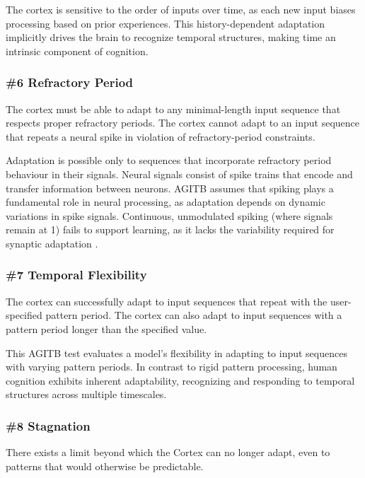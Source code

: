 \documentclass{article}
\newenvironment{one_assertion}[1]
{
	\begin{tabular}{p{1.5cm}p{8.2cm}}
		\textbf{Assertion:} & #1 \\
	}{
	\end{tabular}\\
}
\newenvironment{two_assertions}[2]
{
	\begin{tabular}{p{1.5cm}p{8.2cm}}
		\textbf{Assertion:} & #1 \\
		\textbf{Assertion:} & #2 \\
	}{
	\end{tabular}\\
}
\begin{document}
	The cortex is sensitive to the order of inputs over time, as each new input biases processing based on prior experiences. This history-dependent adaptation implicitly drives the brain to recognize temporal structures, making time an intrinsic component of cognition.
	
	
	\subsubsection*{\#6 Refractory Period}
	\begin{two_assertions}
		{The cortex must be able to adapt to any minimal-length input sequence that respects proper refractory periods.}
		{The cortex cannot adapt to an input sequence that repeats a neural spike in violation of refractory-period constraints.}
	\end{two_assertions}
	
	Adaptation is possible only to sequences that incorporate refractory period behaviour in their signals. Neural signals consist of spike trains that encode and transfer information between neurons. AGITB assumes that spiking plays a fundamental role in neural processing, as adaptation depends on dynamic variations in spike signals. Continuous, unmodulated spiking (where signals remain at 1) fails to support learning, as it lacks the variability required for synaptic adaptation \cite{Gerstner2002}. 
	
	\subsubsection*{\#7 Temporal Flexibility}
	\begin{two_assertions}
		{The cortex can successfully adapt to input sequences that repeat with the user-specified pattern period.}
		{The cortex can also adapt to input sequences with a pattern period longer than the specified value.}
	\end{two_assertions}
	
	This AGITB test evaluates a model’s flexibility in adapting to input sequences with varying pattern periods. In contrast to rigid pattern processing, human cognition exhibits inherent adaptability, recognizing and responding to temporal structures across multiple timescales.
	
	\subsubsection*{\#8 Stagnation}
	\begin{one_assertion}
		{There exists a limit beyond which the Cortex can no longer adapt, even to patterns that would otherwise be predictable.}
	\end{one_assertion}
	
\end{document}
